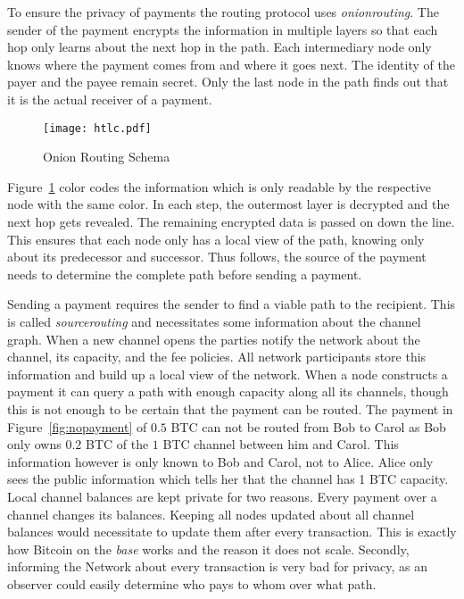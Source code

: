\documentclass[final]{fhnwreport}       %
\begin{document}
To ensure the privacy of payments the routing protocol uses \emph{\gls{onionrouting}}. The sender of the payment encrypts the information in multiple layers so that each hop only learns about the next hop in the path. Each intermediary node only knows where the payment comes from and where it goes next. The identity of the payer and the payee remain secret. Only the last node in the path finds out that it is the actual receiver of a payment.

\begin{figure}[H]
\centering
\texttt{[image: htlc.pdf]}
\caption{Onion Routing Schema}
\label{fig:onion}
\end{figure}

Figure~\ref{fig:onion} color codes the information which is only readable by the respective node with the same color. In each step, the outermost layer is decrypted and the next hop gets revealed. The remaining encrypted data is passed on down the line. This ensures that each node only has a local view of the path, knowing only about its predecessor and successor. Thus follows, the source of the payment needs to determine the complete path before sending a payment.

Sending a payment requires the sender to find a viable path to the recipient. This is called \emph{\gls{sourcerouting}} and necessitates some information about the channel graph. When a new channel opens the parties notify the network about the channel, its capacity, and the fee policies. All network participants store this information and build up a local view of the network. When a node constructs a payment it can query a path with enough capacity along all its channels, though this is not enough to be certain that the payment can be routed. The payment in Figure~\ref{fig:nopayment} of $0.5$ BTC can not be routed from Bob to Carol as Bob only owns $0.2$ BTC of the $1$ BTC channel between him and Carol. This information however is only known to Bob and Carol, not to Alice. Alice only sees the public information which tells her that the channel has 1 BTC capacity. Local channel balances are kept private for two reasons. Every payment over a channel changes its balances. Keeping all nodes updated about all channel balances would necessitate to update them after every transaction. This is exactly how Bitcoin on the \emph{\gls{base}} works and the reason it does not scale. Secondly, informing the Network about every transaction is very bad for privacy, as an observer could easily determine who pays to whom over what path.
\end{document}
